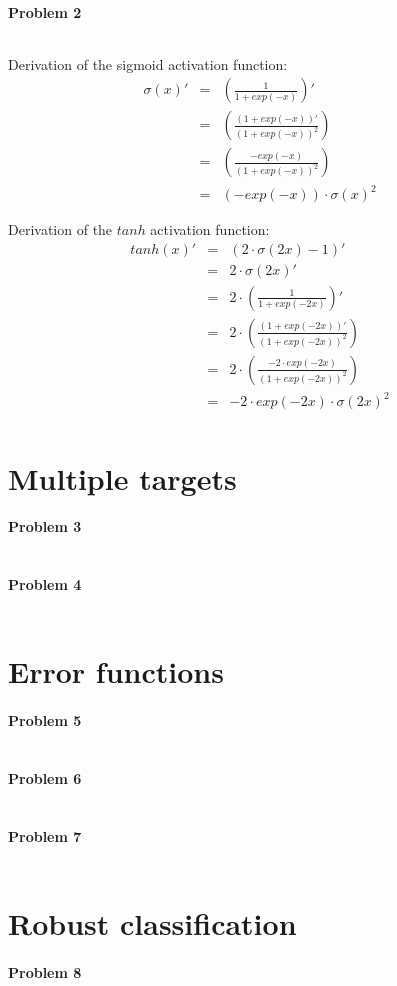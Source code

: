 \documentclass{article}
\begin{document}
\paragraph*{Problem 2}
$\;$

Derivation of the sigmoid activation function:
\begin{eqnarray}
\sigma(x)' &=& \left( \frac{1}{1 + exp(-x)} \right)' \\
&=& \left( \frac{(1 + exp(-x))'}{(1 + exp(-x))^2} \right)\\
&=& \left( \frac{-exp(-x)}{(1 + exp(-x))^2} \right)\\
&=& (-exp(-x)) \cdot \sigma(x)^2
\end{eqnarray}

Derivation of the $tanh$ activation function:
\begin{eqnarray}
tanh(x)' &=& (2 \cdot \sigma(2x) -1)'\\
&=& 2 \cdot \sigma(2x)' \\
&=& 2 \cdot \left( \frac{1}{1 + exp(-2x)} \right)' \\
&=& 2 \cdot \left( \frac{(1 + exp(-2x))'}{(1 + exp(-2x))^2} \right)\\
&=& 2 \cdot \left( \frac{-2 \cdot exp(-2x)}{(1 + exp(-2x))^2} \right)\\
&=& -2 \cdot exp(-2x) \cdot \sigma(2x)^2\\
\end{eqnarray}

\section{Multiple targets}

\paragraph*{Problem 3}
$\;$ 

\paragraph*{Problem 4}
$\;$ 

\section{Error functions}

\paragraph*{Problem 5}
$\;$

\paragraph*{Problem 6}
$\;$ 

\paragraph*{Problem 7}
$\;$ 

\section{Robust classification}

\paragraph*{Problem 8}
$\;$ 
\end{document}
